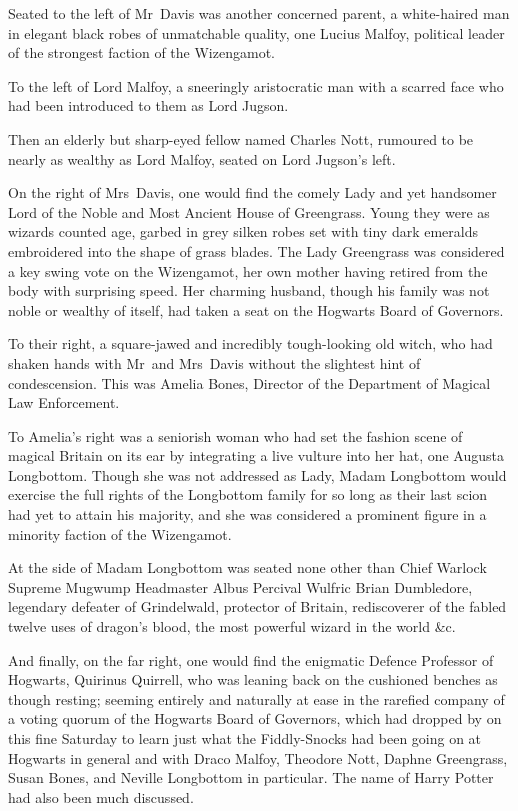 Seated to the left of Mr~Davis was another concerned parent, a white-haired
man in elegant black robes of unmatchable quality, one Lucius Malfoy, political
leader of the strongest faction of the Wizengamot.

To the left of Lord Malfoy, a sneeringly aristocratic man with a scarred face
who had been introduced to them as Lord Jugson.

Then an elderly but sharp-eyed fellow named Charles Nott, rumoured to be nearly
as wealthy as Lord Malfoy, seated on Lord Jugson’s left.

On the right of Mrs~Davis, one would find the comely Lady and yet handsomer
Lord of the Noble and Most Ancient House of Greengrass. Young they were as
wizards counted age, garbed in grey silken robes set with tiny dark emeralds
embroidered into the shape of grass blades. The Lady Greengrass was considered
a key swing vote on the Wizengamot, her own mother having retired from the body
with surprising speed. Her charming husband, though his family was not noble or
wealthy of itself, had taken a seat on the Hogwarts Board of Governors.

To their right, a square-jawed and incredibly tough-looking old witch, who had
shaken hands with Mr~and Mrs~Davis without the slightest hint of
condescension. This was Amelia Bones, Director of the Department of Magical Law
Enforcement.

To Amelia’s right was a seniorish woman who had set the fashion scene of
magical Britain on its ear by integrating a live vulture into her hat, one
Augusta Longbottom. Though she was not addressed as Lady, Madam Longbottom
would exercise the full rights of the Longbottom family for so long as their
last scion had yet to attain his majority, and she was considered a prominent
figure in a minority faction of the Wizengamot.

At the side of Madam Longbottom was seated none other than Chief Warlock
Supreme Mugwump Headmaster Albus Percival Wulfric Brian Dumbledore, legendary
defeater of Grindelwald, protector of Britain, rediscoverer of the fabled
twelve uses of dragon’s blood, the most powerful wizard in the world \&c.

And finally, on the far right, one would find the enigmatic Defence Professor
of Hogwarts, Quirinus Quirrell, who was leaning back on the cushioned benches
as though resting; seeming entirely and naturally at ease in the rarefied
company of a voting quorum of the Hogwarts Board of Governors, which had
dropped by on this fine Saturday to learn just what the Fiddly-Snocks had been
going on at Hogwarts in general and with Draco Malfoy, Theodore Nott, Daphne
Greengrass, Susan Bones, and Neville Longbottom in particular. The name of
Harry Potter had also been much discussed.

